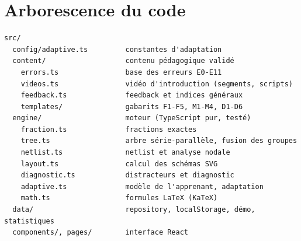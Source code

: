 \documentclass[11pt,a4paper]{report}
\begin{document}
\chapter{Arborescence du code}
\begin{lstlisting}
src/
  config/adaptive.ts         constantes d'adaptation
  content/                   contenu pédagogique validé
    errors.ts                base des erreurs E0-E11
    videos.ts                vidéo d'introduction (segments, scripts)
    feedback.ts              feedback et indices généraux
    templates/               gabarits F1-F5, M1-M4, D1-D6
  engine/                    moteur (TypeScript pur, testé)
    fraction.ts              fractions exactes
    tree.ts                  arbre série-parallèle, fusion des groupes
    netlist.ts               netlist et analyse nodale
    layout.ts                calcul des schémas SVG
    diagnostic.ts            distracteurs et diagnostic
    adaptive.ts              modèle de l'apprenant, adaptation
    math.ts                  formules LaTeX (KaTeX)
  data/                      repository, localStorage, démo, statistiques
  components/, pages/        interface React
\end{lstlisting}
\end{document}
